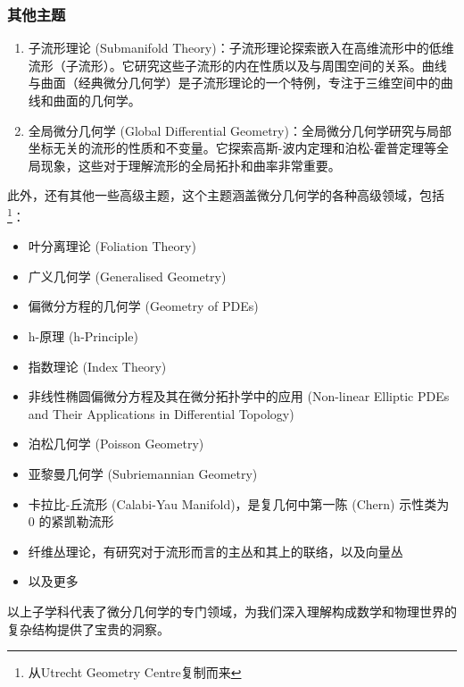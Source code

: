 \subsubsection{其他主题}

\begin{enumerate}
\item 子流形理论 (Submanifold Theory)：子流形理论探索嵌入在高维流形中的低维流形（子流形）。它研究这些子流形的内在性质以及与周围空间的关系。曲线与曲面（经典微分几何学）是子流形理论的一个特例，专注于三维空间中的曲线和曲面的几何学。

\item 全局微分几何学 (Global Differential Geometry)：全局微分几何学研究与局部坐标无关的流形的性质和不变量。它探索高斯-波内定理和泊松-霍普定理等全局现象，这些对于理解流形的全局拓扑和曲率非常重要。
\end{enumerate}


此外，还有其他一些高级主题，这个主题涵盖微分几何学的各种高级领域，包括\footnote{从Utrecht Geometry Centre复制而来}：

\begin{itemize}
\item 叶分离理论 (Foliation Theory)
\item 广义几何学 (Generalised Geometry)
\item 偏微分方程的几何学 (Geometry of PDEs)
\item h-原理 (h-Principle)
\item 指数理论 (Index Theory)
\item 非线性椭圆偏微分方程及其在微分拓扑学中的应用 (Non-linear Elliptic PDEs and Their Applications in Differential Topology)
\item 泊松几何学 (Poisson Geometry)
\item 亚黎曼几何学 (Subriemannian Geometry)
\item 卡拉比-丘流形 (Calabi-Yau Manifold)，是复几何中第一陈 (Chern) 示性类为 $0$ 的紧凯勒流形
\item 纤维丛理论，有研究对于流形而言的主丛和其上的联络，以及向量丛
\item 以及更多
\end{itemize}

以上子学科代表了微分几何学的专门领域，为我们深入理解构成数学和物理世界的复杂结构提供了宝贵的洞察。

